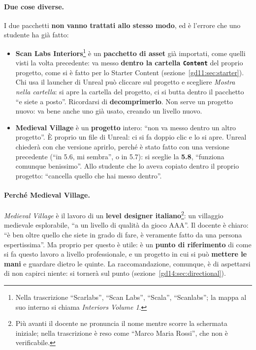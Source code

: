 \paragraph{Due cose diverse.} I due pacchetti \textbf{non vanno trattati allo stesso
modo}, ed è l'errore che uno studente ha già fatto:
\begin{itemize}
  \item \textbf{Scan Labs Interiors}\footnote{Nella trascrizione ``Scarlabs'',
        ``Scan Labs'', ``Scala'', ``Scanlabs''; la mappa al suo interno si chiama
        \emph{Interiors Volume 1}.} è un \textbf{pacchetto di asset} già
        importati, come quelli visti la volta precedente: va messo
        \textbf{dentro la cartella \texttt{Content}} del proprio progetto, come
        si è fatto per lo Starter Content
        (sezione~\ref{gd11:sec:starter}). Chi usa il launcher di Unreal può
        cliccare sul progetto e scegliere \emph{Mostra nella cartella}: si apre
        la cartella del progetto, ci si butta dentro il pacchetto ``e siete a
        posto''. Ricordarsi di \textbf{decomprimerlo}. Non serve un progetto
        nuovo: va bene anche uno già usato, creando un livello nuovo.
  \item \textbf{Medieval Village} è un \textbf{progetto} intero: ``non va messo
        dentro un altro progetto''. È proprio un file di Unreal: ci si fa doppio
        clic e lo si apre. Unreal chiederà con che versione aprirlo, perché è
        stato fatto con una versione precedente (``in 5.6, mi sembra'', o in
        5.7): si sceglie la \textbf{5.8}, ``funziona comunque benissimo''. Allo
        studente che lo aveva copiato dentro il proprio progetto: ``cancella
        quello che hai messo dentro''.
\end{itemize}

\paragraph{Perché Medieval Village.} \emph{Medieval Village} è il lavoro di un
\textbf{level designer italiano}\footnote{Più avanti il docente ne pronuncia il
nome mentre scorre la schermata iniziale; nella trascrizione è reso come ``Marco
Maria Rossi'', che non è verificabile.}: un villaggio medievale esplorabile,
``a un livello di qualità da gioco AAA''. Il docente è chiaro: ``è ben oltre
quello che siete in grado di fare, è veramente fatto da una persona
espertissima''. Ma proprio per questo è utile: è un \textbf{punto di riferimento}
di come si fa questo lavoro a livello professionale, e un progetto in cui si può
\textbf{mettere le mani} e guardare dietro le quinte. La raccomandazione, comunque,
è di aspettarsi di non capirci niente: si tornerà sul punto
(sezione~\ref{gd14:sec:directional}).

